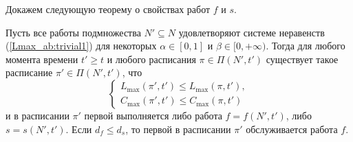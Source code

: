 Докажем следующую теорему о свойствах работ $f$ и $s$.
\begin{theorem} \label{Lmax_ab:th:1}
Пусть все работы подмножества $N' \subseteq N$  удовлетворяют системе неравенств (\ref{Lmax_ab:trivial1}) для некоторых $\alpha \in [0,1]$ и $\beta \in [0, +\infty)$. Тогда для любого момента времени $t' \geq t$ и любого расписания $\pi \in \Pi(N', t')$ существует такое расписание $\pi' \in \Pi(N', t')$, что
\begin{equation}
    \begin{cases}
        L_{\max}(\pi ', t') \leq L_{\max} (\pi, t'),\\
        C_{\max}(\pi ', t') \leq C_{\max} (\pi, t')
    \end{cases}
\end{equation}
и в расписании $\pi'$ первой выполняется либо работа $f = f(N', t')$, либо $s = s(N', t').$ Если $d_f \leq d_s$, то первой в расписании $\pi'$ обслуживается работа $f$.
\end{theorem}
